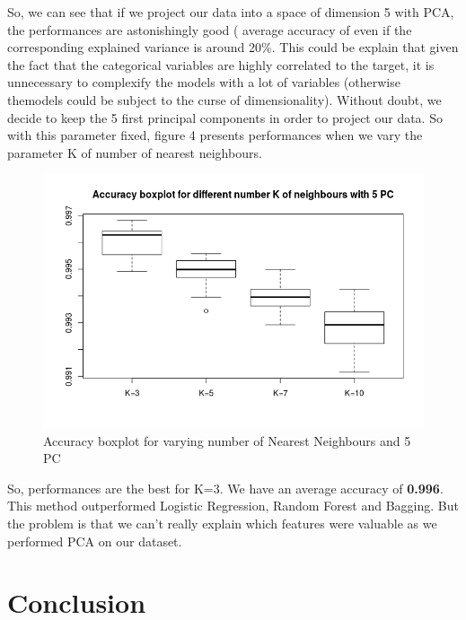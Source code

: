 \documentclass[11pt]{article}
\begin{document}
So, we can see that if we project our data into a space of dimension 5 with PCA, the performances are astonishingly good ( average accuracy of even if the corresponding explained variance is around 20\%. This could be explain that given the fact that the categorical variables are highly correlated to the target, it is unnecessary to complexify the models with a lot of variables (otherwise themodels could be subject to the curse of dimensionality). Without doubt, we decide to keep the 5 first principal components in order to project our data. 
\newpage
So with this parameter fixed, figure 4 presents performances when we vary the parameter K of number of nearest neighbours. 

\begin{figure}[h]
\begin{center}
\includegraphics[scale=0.7]{images/Knn_accuracy.png}

\end{center}
\caption{Accuracy boxplot for varying number of Nearest Neighbours and 5 PC}
\end{figure}



So, performances are the best for K=3. We have an average accuracy of \textbf{0.996}. This method outperformed Logistic Regression, Random Forest and Bagging.  But the problem is that we can't really explain which features were valuable as we performed PCA on our dataset.



\section{Conclusion}
\end{document}
